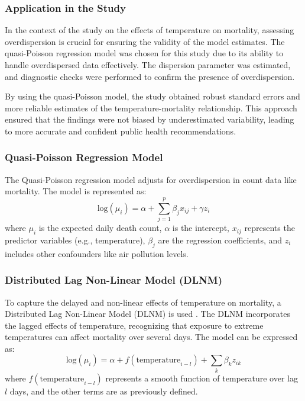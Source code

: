 \documentclass[
]{krantz}
\begin{document}
\subsubsection{Application in the Study}\label{application-in-the-study-2}

In the context of the study on the effects of temperature on mortality, assessing overdispersion is crucial for ensuring the validity of the model estimates. The quasi-Poisson regression model was chosen for this study due to its ability to handle overdispersed data effectively. The dispersion parameter was estimated, and diagnostic checks were performed to confirm the presence of overdispersion.

By using the quasi-Poisson model, the study obtained robust standard errors and more reliable estimates of the temperature-mortality relationship. This approach ensured that the findings were not biased by underestimated variability, leading to more accurate and confident public health recommendations.

\subsubsection{Quasi-Poisson Regression Model}\label{quasi-poisson-regression-model-1}

The Quasi-Poisson regression model adjusts for overdispersion in count data like mortality. The model is represented as:
\[ \text{log}(\mu_i) = \alpha + \sum_{j=1}^{p} \beta_j x_{ij} + \gamma z_i \]
where \(\mu_i\) is the expected daily death count, \(\alpha\) is the intercept, \(x_{ij}\) represents the predictor variables (e.g., temperature), \(\beta_j\) are the regression coefficients, and \(z_i\) includes other confounders like air pollution levels.

\subsubsection{Distributed Lag Non-Linear Model (DLNM)}\label{distributed-lag-non-linear-model-dlnm}

To capture the delayed and non-linear effects of temperature on mortality, a Distributed Lag Non-Linear Model (DLNM) is used \citep{gasparrini2010}. The DLNM incorporates the lagged effects of temperature, recognizing that exposure to extreme temperatures can affect mortality over several days. The model can be expressed as:
\[ \text{log}(\mu_i) = \alpha + f(\text{temperature}_{i-l}) + \sum_{k} \beta_k z_{ik} \]
where \(f(\text{temperature}_{i-l})\) represents a smooth function of temperature over lag \(l\) days, and the other terms are as previously defined.
\end{document}

